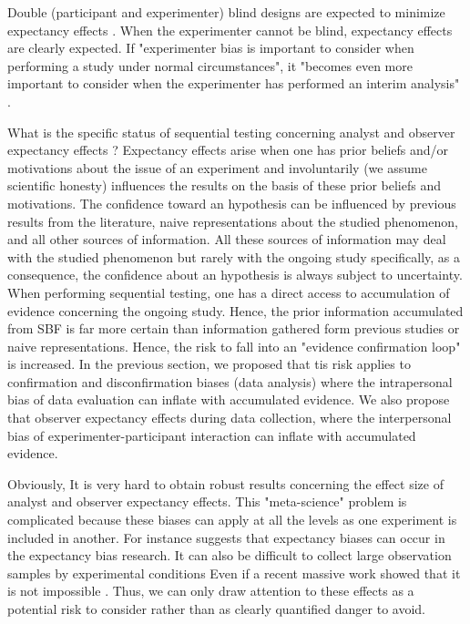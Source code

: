 \documentclass[a4paper,man,natbib,floatsintext,donotrepeattitle]{apa6}
\begin{document}
Double (participant and experimenter) blind designs are expected to minimize expectancy effects \citep{klein_low_2012,gilder_role_2018}. When the experimenter cannot be blind, expectancy effects are clearly expected. If "experimenter bias is important to consider when
performing a study under normal circumstances", it "becomes even more important to consider
when the experimenter has performed an interim analysis" \cite{lakens_performing_2014}. \par

What is the specific status of sequential testing concerning analyst and observer expectancy effects ? Expectancy effects arise when one has prior beliefs and/or motivations about the issue of an experiment and involuntarily (we assume scientific honesty) influences the results on the basis of these prior beliefs and motivations. The confidence toward an hypothesis can be influenced by previous results from the literature, naive representations about the studied phenomenon, and all other sources of information. All these sources of information may deal with the studied phenomenon but rarely with the ongoing study specifically, as a consequence, the confidence about an hypothesis is always subject to uncertainty. When performing sequential testing, one has a direct access to accumulation of evidence concerning the ongoing study. Hence, the prior information accumulated from SBF is far more certain than information gathered form previous studies or naive representations. Hence, the risk to fall into an "evidence confirmation loop" is increased. In the previous section, we proposed that tis risk applies to confirmation and disconfirmation biases (data analysis) where the intrapersonal bias of data evaluation can inflate with accumulated evidence. We also propose that observer expectancy effects during data collection, where the interpersonal bias of experimenter-participant interaction can inflate with accumulated evidence. 

Obviously, It is very hard to obtain robust results concerning the effect size of analyst and observer expectancy effects. This "meta-science" problem is complicated because these biases can apply at all the levels as one experiment is included in another. For instance \cite{barber_expecting_1978} suggests that expectancy biases can occur in the expectancy bias research. It can also be difficult to collect large observation samples by experimental conditions \citep[e.g.,][]{zoble_interaction_1969} Even if a recent massive work showed that it is not impossible \citep {gilder_role_2018}. Thus, we can only draw attention to these effects as a potential risk to consider rather than as clearly quantified danger to avoid. \par
\end{document}
